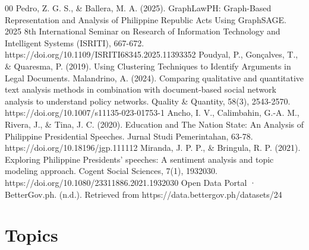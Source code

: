 \documentclass[conference]{IEEEtran}
\begin{document}
\begin{thebibliography}{00}
 Pedro, Z. G. S., \& Ballera, M. A. (2025). GraphLawPH: Graph-Based Representation and Analysis of Philippine Republic Acts Using GraphSAGE. 2025 8th International Seminar on Research of Information Technology and Intelligent Systems (ISRITI), 667-672. https://doi.org/10.1109/ISRITI68345.2025.11393352
 Poudyal, P., Gonçalves, T., \& Quaresma, P. (2019). Using Clustering Techniques to Identify Arguments in Legal Documents.
 Malandrino, A. (2024). Comparing qualitative and quantitative text analysis methods in combination with document-based social network analysis to understand policy networks. Quality \& Quantity, 58(3), 2543-2570. https://doi.org/10.1007/s11135-023-01753-1
 Ancho, I. V., Calimbahin, G.-A. M., Rivera, J., \& Tina, J. C. (2020). Education and The Nation State: An Analysis of Philippine Presidential Speeches. Jurnal Studi Pemerintahan, 63-78. https://doi.org/10.18196/jgp.111112
 Miranda, J. P. P., \& Bringula, R. P. (2021). Exploring Philippine Presidents' speeches: A sentiment analysis and topic modeling approach. Cogent Social Sciences, 7(1), 1932030. https://doi.org/10.1080/23311886.2021.1932030
 Open Data Portal · BetterGov.ph. (n.d.). Retrieved from https://data.bettergov.ph/datasets/24

\end{thebibliography}

\onecolumn

\appendices

\section{Topics}\label{topics}
\end{document}
